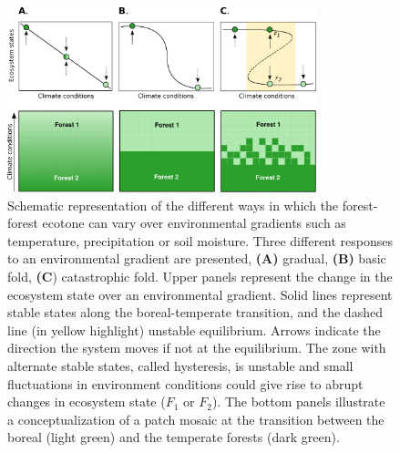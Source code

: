 \begin{figure}[t]
	\begin{center}
	\includegraphics[width=0.8\textwidth]{fig/states.pdf}
	\end{center}
	\caption{Schematic representation of the different ways in which the forest-forest ecotone can vary over environmental gradients such as temperature, precipitation
	or soil moisture. Three different responses to an environmental gradient are presented,
	\textbf{(A)} gradual, \textbf{(B)} basic fold, \textbf{(C}) catastrophic fold.
	Upper panels represent the change in the ecosystem state over an environmental gradient. Solid lines represent stable states along the boreal-temperate
	transition, and the dashed line (in yellow highlight) unstable equilibrium. Arrows indicate the
	direction the system moves if not at the equilibrium. The zone with alternate stable states,
	called hysteresis, is unstable and small fluctuations in
	environment conditions could give rise to abrupt changes in ecosystem state ($F_1$ or $F_2$). 
	The bottom panels illustrate a conceptualization of a patch mosaic at the transition
	between the boreal (light green) and the temperate forests (dark
	green).}
	\label{fig1}
	\vspace{-1.25em}
\end{figure}


